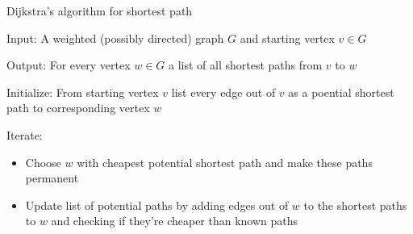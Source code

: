 \documentclass{beamer}
\begin{document}
\begin{frame}{Dijkstra's algorithm for shortest path}
  \begin{block}{Input:} A weighted (possibly directed) graph $G$ and starting vertex $v\in G$
  \end{block}
  \begin{block}{Output:} For every vertex $w\in G$ a list of all shortest paths from $v$ to $w$
  \end{block}
  
 \begin{block}{Initialize:}
   From starting vertex $v$ list every edge out of $v$ as a poential shortest path to corresponding vertex $w$
   \end{block}
       \begin{block}{Iterate:}
 \begin{itemize}
 \item Choose $w$ with cheapest potential shortest path and make these paths permanent


 \item Update list of potential paths by adding edges out of $w$ to the shortest paths to $w$ and checking if they're cheaper than known paths
   \end{itemize}
 \end{block}
  \end{frame}
\end{document}
